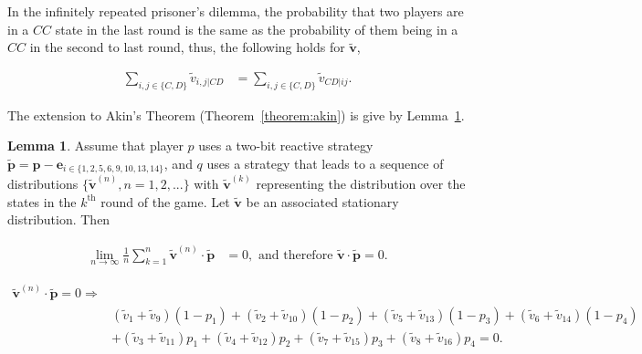 \documentclass{article}
\theoremstyle{definition}
\newtheorem{lemma}[theorem]{Lemma}
\begin{document}
In the infinitely repeated prisoner's dilemma, the probability that two players
are in a \(CC\) state in the last round is the same as the probability of them
being in a \(CC\) in the second to last round, thus, the following holds for
\(\mathbf{\tilde{v}}\),

\begin{align}
  \sum_{i, j \in \{C, D\}} \tilde{v}_{i, j | CD} & = \sum_{i, j \in \{C, D\}} \tilde{v}_{CD | ij}.
\end{align}

The extension to Akin's Theorem (Theorem~\ref{theorem:akin}) is give by
Lemma~\ref{lemma:akin_extended}.

\begin{lemma}\label{lemma:akin_extended}
  Assume that player \(p\) uses a two-bit reactive strategy \(\mathbf{\tilde{p}} = \mathbf{p} - \mathbf{e}_{i \in \{1, 2,
  5, 6, 9, 10, 13, 14\}}\), and \(q\) uses a strategy that leads to a sequence
  of distributions \(\{\mathbf{\tilde{v}}^{(n)}, n = 1, 2, ...\}\) with
  \(\mathbf{\tilde{v}}^{(k)}\) representing the distribution over the states in the
  \(k^{\text{th}}\) round of the game. Let \(\mathbf{\tilde{v}}\) be an associated
  stationary distribution. Then

  \begin{align*}
    \lim_{n \rightarrow \infty} \frac{1}{n} \sum_{k=1}^{n} \mathbf{\tilde{v}}^{(n)} \cdot\mathbf{\tilde{p}} & = 0, \text{ and therefore } \mathbf{\tilde{v}} \cdot \mathbf{\tilde{p}} = 0.
  \end{align*}

  \begin{align}\label{eq:akin_extended}
  \mathbf{\tilde{v}}^{(n)} \cdot \mathbf{\tilde{p}} = 0 \Rightarrow & \nonumber \\
  & (\tilde{v}_{1} + \tilde{v}_{9}) (1 - p_1) + (\tilde{v}_{2} + \tilde{v}_{10}) (1 - p_2)  + (\tilde{v}_{5} + \tilde{v}_{13}) (1 - p_3) + (\tilde{v}_{6} + \tilde{v}_{14}) (1 - p_4) \nonumber \\
  & + (\tilde{v}_{3} + \tilde{v}_{11})p_1  + (\tilde{v}_{4} + \tilde{v}_{12})p_2 + (\tilde{v}_{7} + \tilde{v}_{15}) p_3 + (\tilde{v}_{8} + \tilde{v}_{16}) p_4 = 0.
  \end{align}
\end{lemma}
\end{document}
